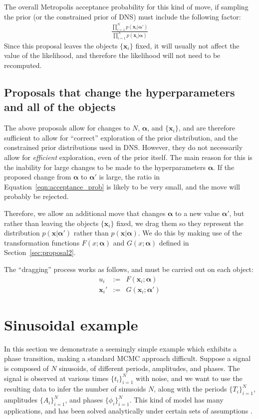\documentclass[letterpaper, 11pt]{article}
\newcommand{\hyperparams}{\boldsymbol{\alpha}}
\newcommand{\xx}{\mathbf{x}}
\begin{document}
The overall Metropolis acceptance probability
for this kind of move, if sampling the prior (or the constrained prior of DNS)
must include the following factor:
\begin{eqnarray}
\frac{\prod_{i=1}^N p(\xx_i | \hyperparams')}{\prod_{i=1}^N p(\xx_i | \hyperparams)}
\label{eqn:acceptance_prob}
\end{eqnarray}
Since this proposal leaves the objects $\{\xx_i\}$ fixed, it will usually not
affect the value of the likelihood, and therefore the likelihood will not need
to be recomputed.

\subsection{Proposals that change the hyperparameters
and all of the objects}\label{sec:proposal4}
The above proposals allow for changes to $N$, $\hyperparams$, and $\{\xx_i\}$,
and are therefore sufficient to allow for ``correct'' exploration of the
prior distribution, and the constrained prior distributions used in DNS.
However, they do not necessarily allow for {\it efficient} exploration, even
of the prior itself. The main reason for this is the inability for large
changes to be made to the hyperparameters $\hyperparams$. If the proposed change
from $\hyperparams$ to $\hyperparams'$ is large, the ratio in
Equation~\ref{eqn:acceptance_prob} is likely to be very small, and the move
will probably be rejected.

Therefore, we allow an additional move that changes $\hyperparams$ to a new
value $\hyperparams'$, but rather than leaving the objects $\{\xx_i\}$ fixed, we
drag them so they represent the distribution $p(\xx | \hyperparams')$ rather than
$p(\xx|\hyperparams)$. We do this by making use of the transformation functions
$F(x; \hyperparams)$ and $G(x; \hyperparams)$ defined in Section~\ref{sec:proposal2}.

The ``dragging'' process works as follows, and must be carried out on
each object:
\begin{eqnarray}
u_i &:=& F(\xx_i; \hyperparams)\\
\xx_i' &:=& G(\xx_i; \hyperparams')
\end{eqnarray}

\section{Sinusoidal example}
In this section we demonstrate a seemingly simple example which exhibits
a phase transition, making a standard MCMC approach difficult. Suppose
a signal is composed of $N$ sinusoids, of different periods, amplitudes,
and phases. The signal is observed at various times $\{t_i\}_{i=1}^N$ with
noise, and we want to use the resulting data to infer the number of sinusoids
$N$, along with the periods $\{T_i\}_{i=1}^N$, amplitudes $\{A_i\}_{i=1}^N$,
and phases $\{\phi_i\}_{i=1}^N$.
This kind of model has many applications, and has been solved analytically
under certain sets of assumptions \citep[see e.g.][]{bretthorst}.
\end{document}
